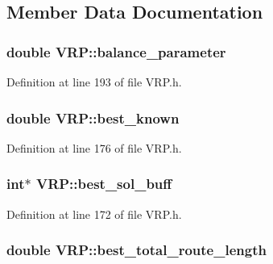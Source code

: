 \subsection{Member Data Documentation}
\hypertarget{class_v_r_p_a90a29b6636daa9e4ada8c01069b52d07}{
\subsubsection[{balance\_\-parameter}]{\setlength{\rightskip}{0pt plus 5cm}double {\bf VRP::balance\_\-parameter}}}
\label{class_v_r_p_a90a29b6636daa9e4ada8c01069b52d07}


Definition at line 193 of file VRP.h.

\hypertarget{class_v_r_p_a8c1aea504be581f3d44cbe809343dd59}{
\subsubsection[{best\_\-known}]{\setlength{\rightskip}{0pt plus 5cm}double {\bf VRP::best\_\-known}}}
\label{class_v_r_p_a8c1aea504be581f3d44cbe809343dd59}


Definition at line 176 of file VRP.h.

\hypertarget{class_v_r_p_a3f3ca7d6c3a3c632c07750afa2b31b63}{
\subsubsection[{best\_\-sol\_\-buff}]{\setlength{\rightskip}{0pt plus 5cm}int$\ast$ {\bf VRP::best\_\-sol\_\-buff}}}
\label{class_v_r_p_a3f3ca7d6c3a3c632c07750afa2b31b63}


Definition at line 172 of file VRP.h.

\hypertarget{class_v_r_p_afd48775dd53edd84340f68f704b8f9dc}{
\subsubsection[{best\_\-total\_\-route\_\-length}]{\setlength{\rightskip}{0pt plus 5cm}double {\bf VRP::best\_\-total\_\-route\_\-length}}}
\label{class_v_r_p_afd48775dd53edd84340f68f704b8f9dc}


